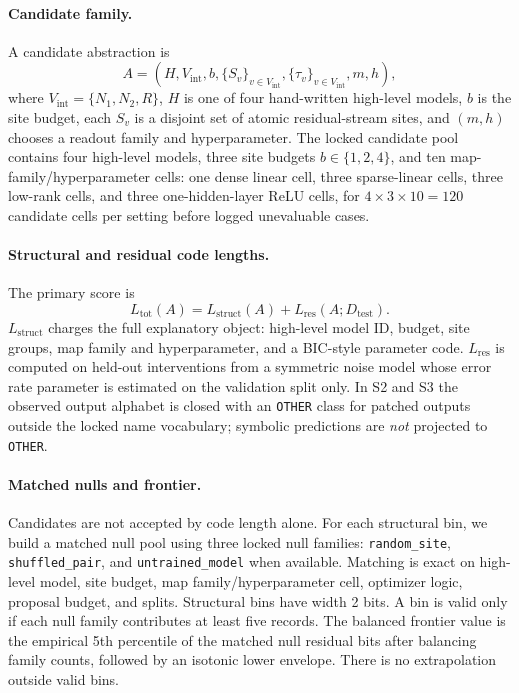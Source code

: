 \documentclass[10pt]{article}
\newcommand{\Lstruct}{L_{\mathrm{struct}}}
\newcommand{\Lres}{L_{\mathrm{res}}}
\newcommand{\Ltot}{L_{\mathrm{tot}}}
\begin{document}
\paragraph{Candidate family.}
A candidate abstraction is
\[
A=(H,V_{\mathrm{int}},b,\{S_v\}_{v\in V_{\mathrm{int}}},\{\tau_v\}_{v\in V_{\mathrm{int}}},m,h),
\]
where $V_{\mathrm{int}}=\{N_1,N_2,R\}$, $H$ is one of four hand-written high-level models, $b$ is the site budget, each $S_v$ is a disjoint set of atomic residual-stream sites, and $(m,h)$ chooses a readout family and hyperparameter. The locked candidate pool contains four high-level models, three site budgets $b\in\{1,2,4\}$, and ten map-family/hyperparameter cells: one dense linear cell, three sparse-linear cells, three low-rank cells, and three one-hidden-layer ReLU cells, for $4\times 3\times 10=120$ candidate cells per setting before logged unevaluable cases.

\paragraph{Structural and residual code lengths.}
The primary score is
\[
\Ltot(A)=\Lstruct(A)+\Lres(A;D_{\mathrm{test}}).
\]
$\Lstruct$ charges the full explanatory object: high-level model ID, budget, site groups, map family and hyperparameter, and a BIC-style parameter code. $\Lres$ is computed on held-out interventions from a symmetric noise model whose error rate parameter is estimated on the validation split only. In S2 and S3 the observed output alphabet is closed with an \texttt{OTHER} class for patched outputs outside the locked name vocabulary; symbolic predictions are \emph{not} projected to \texttt{OTHER}.

\paragraph{Matched nulls and frontier.}
Candidates are not accepted by code length alone. For each structural bin, we build a matched null pool using three locked null families: \texttt{random\_site}, \texttt{shuffled\_pair}, and \texttt{untrained\_model} when available. Matching is exact on high-level model, site budget, map family/hyperparameter cell, optimizer logic, proposal budget, and splits. Structural bins have width 2 bits. A bin is valid only if each null family contributes at least five records. The balanced frontier value is the empirical 5th percentile of the matched null residual bits after balancing family counts, followed by an isotonic lower envelope. There is no extrapolation outside valid bins.
\end{document}
